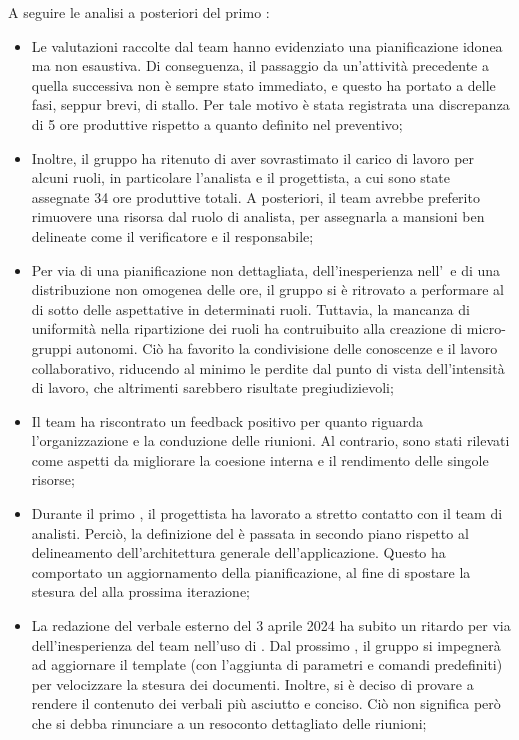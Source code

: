 \vspace{0.5\baselineskip}
\par A seguire le analisi a posteriori del primo :
\begin{itemize}
  \item Le valutazioni raccolte dal team hanno evidenziato una pianificazione idonea ma non esaustiva. Di conseguenza, il passaggio da un'attività precedente a quella successiva non è sempre stato immediato, e questo ha portato a delle fasi, seppur brevi, di stallo. Per tale motivo è stata registrata una discrepanza di 5 ore produttive rispetto a quanto definito nel preventivo;
  \item Inoltre, il gruppo ha ritenuto di aver sovrastimato il carico di lavoro per alcuni ruoli, in particolare l'analista e il progettista, a cui sono state assegnate 34 ore produttive totali. A posteriori, il team avrebbe preferito rimuovere una risorsa dal ruolo di analista, per assegnarla a mansioni ben delineate come il verificatore e il responsabile;
  \item Per via di una pianificazione non dettagliata, dell'inesperienza nell'\AdR\ e di una distribuzione non omogenea delle ore, il gruppo si è ritrovato a performare al di sotto delle aspettative in determinati ruoli. Tuttavia, la mancanza di uniformità nella ripartizione dei ruoli ha contruibuito alla creazione di micro-gruppi autonomi. Ciò ha favorito la condivisione delle conoscenze e il lavoro collaborativo, riducendo al minimo le perdite dal punto di vista dell'intensità di lavoro, che altrimenti sarebbero risultate pregiudizievoli;
  \item Il team ha riscontrato un feedback positivo per quanto riguarda l'organizzazione e la conduzione delle riunioni. Al contrario, sono stati rilevati come aspetti da migliorare la coesione interna e il rendimento delle singole risorse;
  \item Durante il primo , il progettista ha lavorato a stretto contatto con il team di analisti. Perciò, la definizione del  è passata in secondo piano rispetto al delineamento dell'architettura generale dell'applicazione. Questo ha comportato un aggiornamento della pianificazione, al fine di spostare la stesura del  alla prossima iterazione;
  \item La redazione del verbale esterno del 3 aprile 2024 ha subito un ritardo per via dell'inesperienza del team nell'uso di . Dal prossimo , il gruppo si impegnerà ad aggiornare il template  (con l'aggiunta di parametri e comandi predefiniti) per velocizzare la stesura dei documenti. Inoltre, si è deciso di provare a rendere il contenuto dei verbali più asciutto e conciso. Ciò non significa però che si debba rinunciare a un resoconto dettagliato delle riunioni;

\end{itemize}
